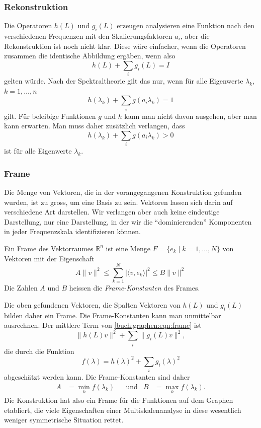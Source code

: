 \subsubsection{Rekonstruktion}
Die Operatoren $h(L)$ und $g_i(L)$ erzeugen analysieren eine Funktion
nach den verschiedenen Frequenzen mit den Skalierungsfaktoren $a_i$,
aber die Rekonstruktion ist noch nicht klar.
Diese wäre einfacher, wenn die Operatoren zusammen die identische
Abbildung ergäben, wenn also
\[
h(L) + \sum_{i}g_i(L)=I
\]
gelten würde.
Nach der Spektraltheorie gilt das nur, wenn für alle Eigenwerte
$\lambda_k$, $k=1,\dots,n$
\[
h(\lambda_k) + \sum_ig(a_i\lambda_k)=1
\]
gilt.
Für beleibige Funktionen $g$ und $h$ kann man nicht davon ausgehen,
aber man kann erwarten.
Man muss daher zusätzlich verlangen, dass
\[
h(\lambda_k) + \sum_{i} g(a_i\lambda_k) > 0
\]
ist für alle Eigenwerte $\lambda_k$.

\subsubsection{Frame}
Die Menge von Vektoren, die in der vorangegangenen Konstruktion gefunden
wurden, ist zu gross, um eine Basis zu sein.
Vektoren lassen sich darin auf verschiedene Art darstellen.
Wir verlangen aber auch keine eindeutige Darstellung, nur eine 
Darstellung, in der wir die ``dominierenden'' Komponenten in jeder
Frequenzskala identifizieren können.

\begin{definition}
\label{buch:graphen:def:frame}
Ein Frame des Vektorraumes $\mathbb{R}^n$ ist eine Menge
$F=\{e_k\;|\; k=1,\dots,N\}$ von Vektoren mit der Eigenschaft
\begin{equation}
A\|v\|^2
\le
\sum_{k=1}^N  |\langle v,e_k\rangle|^2
\le
B\|v\|^2
\label{buch:graphen:eqn:frame}
\end{equation}
Die Zahlen $A$  und $B$ heissen die {\em Frame-Konstanten} des Frames.
\end{definition}

Die oben gefundenen Vektoren, die Spalten Vektoren von $h(L)$ und $g_i(L)$
bilden daher ein Frame.
Die Frame-Konstanten kann man unmittelbar ausrechnen.
Der mittlere Term von \eqref{buch:graphen:eqn:frame} ist 
\[
\|h(L) v\|^2
+
\sum_{i} \|g_i(L)v\|^2,
\]
die durch die Funktion
\[
f(\lambda)
=
h(\lambda)^2 + \sum_i g_i(\lambda)^2
\]
abgeschätzt werden kann.
Die Frame-Konstanten sind daher
\begin{align*}
A&=\min_{k} f(\lambda_k)
&
&\text{und}&
B&=\max_{k} f(\lambda_k).
\end{align*}
Die Konstruktion hat also ein Frame für die Funktionen auf dem Graphen
etabliert, die viele Eigenschaften einer Multiskalenanalyse in diese
wesentlich weniger symmetrische Situation rettet.




